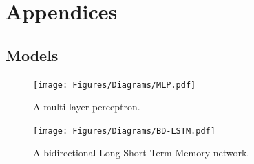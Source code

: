 \documentclass[mstat,12pt]{unswthesis}
\begin{document}



\setcounter{secnumdepth}{0} %
\hypertarget{appendices}{\section{Appendices}\label{appendices}}
\setcounter{secnumdepth}{2} %

\renewcommand*\thesubsection{A.\arabic{subsection}} %

\hypertarget{models}{\subsection{Models}\label{models}}

\renewcommand*\thefigure{\arabic{figure}} %

\begin{figure}[H]
\centerline{\texttt{[image: Figures/Diagrams/MLP.pdf]}}
\caption{A multi-layer perceptron.}
\label{MLP} 
\end{figure}

\begin{figure}[H]
\centerline{\texttt{[image: Figures/Diagrams/BD-LSTM.pdf]}}
\caption{A bidirectional Long Short Term Memory network.}
\label{BD-LSTM}
\end{figure}
\end{document}

